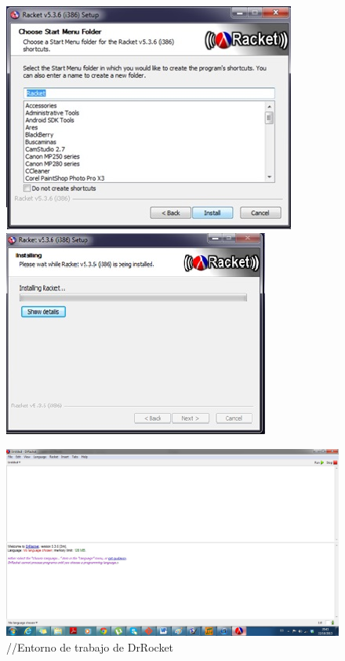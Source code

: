 \documentclass[11pt]{article} %
\begin{document}
\begin{figure}[H]
   \begin{center}
        \includegraphics{imagenes_investigacion/paso_tres.jpg}  
   \end{center}
\caption { }
\label{Figura 3}

    \begin{center}
   	\includegraphics{imagenes_investigacion/paso_cuatro.jpg}
    \end{center}
\caption { }
\label{Figura 4}
\end{figure}


\begin{figure}[H]
\centering
    \includegraphics[width=450pts] {imagenes_investigacion/entorno.jpg}
\caption {//Entorno de trabajo de DrRocket}
\label{Figura 5}
\end{figure}
\end{document}
